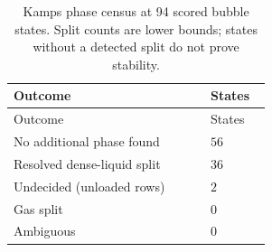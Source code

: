 \begingroup\small\setlength{\tabcolsep}{3pt}
\begin{longtable}{@{}>{\raggedright\arraybackslash}p{0.65\linewidth}>{\raggedright\arraybackslash}p{0.2\linewidth}@{}}
\caption{Kamps phase census at 94 scored bubble states. Split counts are lower bounds; states without a detected split do not prove stability.}\label{tab:p2-kamps-census}\\
\toprule Outcome & States \\ \midrule\endfirsthead
\toprule Outcome & States \\ \midrule\endhead
\bottomrule\endfoot
No additional phase found & $56$ \\
Resolved dense-liquid split & $36$ \\
Undecided (unloaded rows) & $2$ \\
Gas split & $0$ \\
Ambiguous & $0$ \\
\end{longtable}\endgroup
